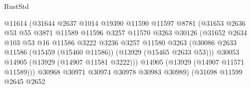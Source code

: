 \begin{lexlean}{RustStd}
\begin{coremodule}
                                        @11614
                                        (@31644
                                          @2637
                                          @1014
                                          @19390
                                          @11590
                                          @11597
                                          @8781
                                          (@31653
                                            @2636
                                            @53
                                            @55
                                            @3871
                                            @11589
                                            @11596
                                            @3257
                                            @11570
                                            @3263
                                            @30126
                                            (@31652
                                              @2634
                                              @103
                                              @53
                                              @16
                                              @11586
                                              @3222
                                              @3236
                                              @3257
                                              @11580
                                              @3263
                                              (@30086
                                                @2633
                                                @11586
                                                (@15459 (@15460 @11586))
                                                (@13929 (@15465 @2633 @53)))
                                              @30053
                                              @14905
                                              (@13929 (@14907 @11581 @3222)))
                                            @14905
                                            (@13929 (@14907 @11571 @11589)))
                                          @30968
                                          @30971
                                          @30974
                                          @30978
                                          @30983
                                          @30989)
                                        (@31698
                                          @11599
                                          @2645
                                          @2652

\end{coremodule}
\end{lexlean}
